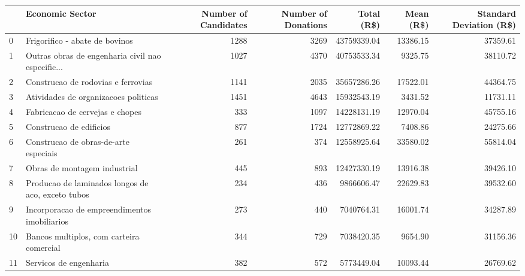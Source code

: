 \begin{tabular}{llrrrrr}
\toprule
{} &                                    Economic Sector &  Number of Candidates &  Number of Donations &  Total (R\$) &  Mean (R\$) &  Standard Deviation (R\$) \\
\midrule
0   &                     Frigorifico - abate de bovinos &                  1288 &                 3269 & 43759339.04 &   13386.15 &                 37359.61 \\
1   &  Outras obras de engenharia civil nao especific... &                  1027 &                 4370 & 40753533.34 &    9325.75 &                 38110.72 \\
2   &                 Construcao de rodovias e ferrovias &                  1141 &                 2035 & 35657286.26 &   17522.01 &                 44364.75 \\
3   &               Atividades de organizacoes politicas &                  1451 &                 4643 & 15932543.19 &    3431.52 &                 11731.11 \\
4   &                    Fabricacao de cervejas e chopes &                   333 &                 1097 & 14228131.19 &   12970.04 &                 45755.16 \\
5   &                            Construcao de edificios &                   877 &                 1724 & 12772869.22 &    7408.86 &                 24275.66 \\
6   &              Construcao de obras-de-arte especiais &                   261 &                  374 & 12558925.64 &   33580.02 &                 55814.04 \\
7   &                       Obras de montagem industrial &                   445 &                  893 & 12427330.19 &   13916.38 &                 39426.10 \\
8   &  Producao de laminados longos de aco, exceto tubos &                   234 &                  436 &  9866606.47 &   22629.83 &                 39532.60 \\
9   &       Incorporacao de empreendimentos imobiliarios &                   273 &                  440 &  7040764.31 &   16001.74 &                 34287.89 \\
10  &           Bancos multiplos, com carteira comercial &                   344 &                  729 &  7038420.35 &    9654.90 &                 31156.36 \\
11  &                             Servicos de engenharia &                   382 &                  572 &  5773449.04 &   10093.44 &                 26769.62 \\

\end{tabular}
